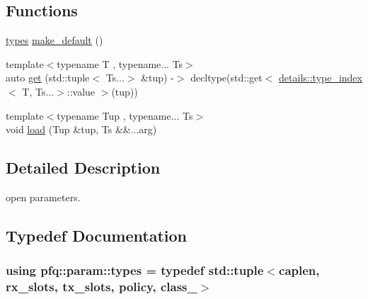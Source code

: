 \subsection*{Functions}
\begin{DoxyCompactItemize}
\item 
\hyperlink{namespacepfq_1_1param_a287394f9fea16ebb76e770334aedd2d5}{types} \hyperlink{namespacepfq_1_1param_af1fd1aeb980688527db587b35f55abf2}{make\+\_\+default} ()
\item 
{\footnotesize template$<$typename T , typename... Ts$>$ }\\auto \hyperlink{namespacepfq_1_1param_a09da2abc1a228d7f77c35bed3bdb157d}{get} (std\+::tuple$<$ Ts...$>$ \&tup) -\/$>$ decltype(std\+::get$<$ \hyperlink{structpfq_1_1param_1_1details_1_1type__index}{details\+::type\+\_\+index}$<$ T, Ts...$>$\+::value $>$(tup))
\item 
{\footnotesize template$<$typename Tup , typename... Ts$>$ }\\void \hyperlink{namespacepfq_1_1param_aeabbdcec021e01a0a9321678fea99d8f}{load} (Tup \&tup, Ts \&\&...arg)
\end{DoxyCompactItemize}


\subsection{Detailed Description}
open parameters. 

\subsection{Typedef Documentation}
\hypertarget{namespacepfq_1_1param_a287394f9fea16ebb76e770334aedd2d5}{
\subsubsection[{types}]{\setlength{\rightskip}{0pt plus 5cm}using {\bf pfq\+::param\+::types} = typedef std\+::tuple$<${\bf caplen}, {\bf rx\+\_\+slots}, {\bf tx\+\_\+slots}, {\bf policy}, {\bf class\+\_\+}$>$}}\label{namespacepfq_1_1param_a287394f9fea16ebb76e770334aedd2d5}


